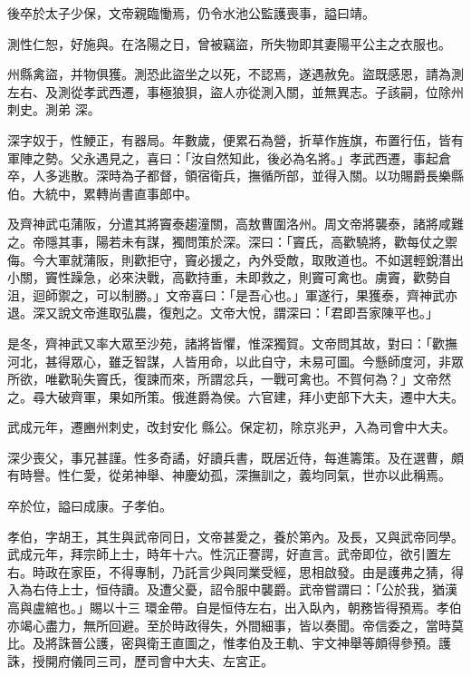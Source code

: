 \begin{pinyinscope}
 後卒於太子少保，文帝親臨慟焉，仍令水池公監護喪事，謚曰靖。



 測性仁恕，好施與。在洛陽之日，曾被竊盜，所失物即其妻陽平公主之衣服也。



 州縣禽盜，并物俱獲。測恐此盜坐之以死，不認焉，遂遇赦免。盜既感恩，請為測左右、及測從孝武西遷，事極狼狽，盜人亦從測入關，並無異志。子該嗣，位除州刺史。測弟
 深。



 深字奴于，性鯁正，有器局。年數歲，便累石為營，折草作旌旗，布置行伍，皆有軍陣之勢。父永遇見之，喜曰：「汝自然知此，後必為名將。」孝武西遷，事起倉卒，人多逃散。深時為子都督，領宿衛兵，撫循所部，並得入關。以功賜爵長樂縣伯。大統中，累轉尚書直事郎中。



 及齊神武屯蒲阪，分遣其將竇泰趨潼關，高敖曹圍洛州。周文帝將襲泰，諸將咸難之。帝隱其事，陽若未有謀，獨問策於深。深曰：「竇氏，高歡驍將，歡每仗之禦侮。今大軍就蒲阪，則歡拒守，竇必援之，內外受敵，取敗道也。不如選輕銳潛出
 小關，竇性躁急，必來決戰，高歡持重，未即救之，則竇可禽也。虜竇，歡勢自沮，迴師禦之，可以制勝。」文帝喜曰：「是吾心也。」軍遂行，果獲泰，齊神武亦退。深又說文帝進取弘農，復剋之。文帝大悅，謂深曰：「君即吾家陳平也。」



 是冬，齊神武又率大眾至沙苑，諸將皆懼，惟深獨賀。文帝問其故，對曰：「歡撫河北，甚得眾心，雖乏智謀，人皆用命，以此自守，未易可圖。今懸師度河，非眾所欲，唯歡恥失竇氏，復諫而來，所謂忿兵，一戰可禽也。不賀何為？」文帝然之。尋大破齊軍，果如所策。俄進爵為侯。六官建，拜小吏部下大夫，遷中大夫。



 武成元年，遷豳州刺史，改封安化
 縣公。保定初，除京兆尹，入為司會中大夫。



 深少喪父，事兄甚謹。性多奇譎，好讀兵書，既居近侍，每進籌策。及在選曹，頗有時譽。性仁愛，從弟神舉、神慶幼孤，深撫訓之，義均同氣，世亦以此稱焉。



 卒於位，謚曰成康。子孝伯。



 孝伯，字胡王，其生與武帝同日，文帝甚愛之，養於第內。及長，又與武帝同學。武成元年，拜宗師上士，時年十六。性沉正謇諤，好直言。武帝即位，欲引置左右。時政在家臣，不得專制，乃託言少與同業受經，思相啟發。由是護弗之猜，得入為右侍上士，恒侍讀。及遭父憂，詔令服中襲爵。武帝嘗謂曰：「公於我，猶漢高與盧綰也。」賜以十三
 環金帶。自是恒侍左右，出入臥內，朝務皆得預焉。孝伯亦竭心盡力，無所回避。至於時政得失，外間細事，皆以奏聞。帝信委之，當時莫比。及將誅晉公護，密與衛王直圖之，惟孝伯及王軌、宇文神舉等頗得參預。護誅，授開府儀同三司，歷司會中大夫、左宮正。




\end{pinyinscope}
